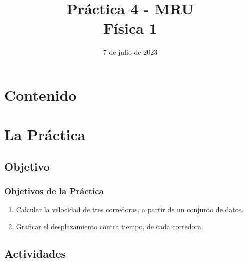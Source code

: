\documentclass[14pt]{beamer}
\title{\Large{Práctica 4 - MRU} \\ \normalsize{Física 1}}
\date{7 de julio de 2023}
\begin{document}
\maketitle

\section*{Contenido}

\section{La Práctica}
\subsection{Objetivo}

\begin{frame}
\frametitle{Objetivos de la Práctica}
\begin{enumerate}[<+->]
\item Calcular la velocidad de tres corredoras, a partir de un conjunto de datos.
\item Graficar el desplazamiento contra tiempo, de cada corredora.
\end{enumerate}
\end{frame}

\subsection{Actividades}
\end{document}
